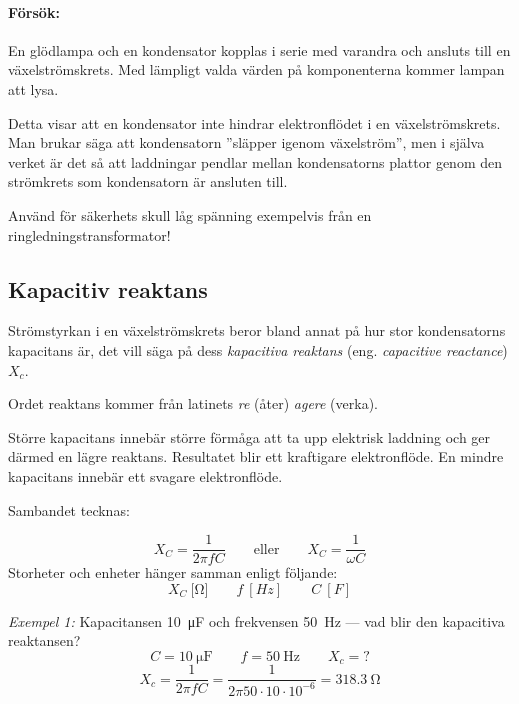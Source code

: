 
\paragraph{Försök:}

En glödlampa och en kondensator kopplas i serie med varandra och ansluts till en
växelströmskrets. Med lämpligt valda värden på komponenterna kommer lampan att
lysa.

Detta visar att en kondensator inte hindrar elektronflödet i en växelströmskrets.
Man brukar säga att kondensatorn ''släpper igenom växelström'', men i själva 
verket är det så att laddningar pendlar mellan kondensatorns plattor genom den
strömkrets som kondensatorn är ansluten till.

Använd för säkerhets skull låg spänning exempelvis från en ringledningstransformator!

\subsection{Kapacitiv reaktans}

Strömstyrkan i en växelströmskrets beror bland annat på hur stor kondensatorns
kapacitans är, det vill säga på dess \emph{kapacitiva reaktans} (eng.
\emph{capacitive reactance}) \(X_c\).

Ordet reaktans kommer från latinets \emph{re} (åter) \emph{agere} (verka).

Större kapacitans innebär större förmåga att ta upp elektrisk laddning och ger
därmed en lägre reaktans. Resultatet blir ett kraftigare elektronflöde.
En mindre kapacitans innebär ett svagare elektronflöde.

Sambandet tecknas:

\[
X_C = \frac{1}{2\pi fC} \qquad \mathrm{eller} \qquad X_C = \dfrac{1}{\omega C}
\]
Storheter och enheter hänger samman enligt följande:
\[
	X_C\ \unit{[\ohm]} \qquad 
	f\ \unit{[Hz]} \qquad 
	C\ \unit{[F]}
\]


\noindent\emph{Exempel 1:} Kapacitansen \SI{10}{\micro\farad} och frekvensen \SI{50}{Hz} --- vad blir den kapacitiva reaktansen?
\[ C = \SI{10}{\micro\farad} \qquad f = \SI{50}{\hertz} \qquad X_c = ? \]
\[ X_c = \frac{1}{2 \pi f C} = \frac{1}{2\pi 50 \cdot 10 \cdot
  10^{-6}} = \SI{318,3}{\ohm} \]

